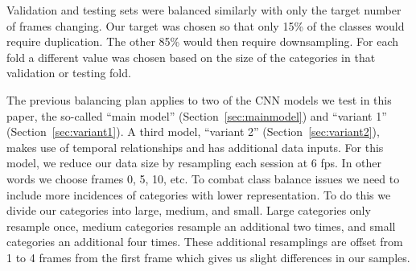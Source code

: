 \documentclass[letterpaper, 10 pt, conference]{ieeeconf}  %
\begin{document}
Validation and testing sets were balanced similarly with only the target number of frames changing. Our target was chosen so that only 15\% of the classes would require duplication. The other 85\% would then require downsampling. For each fold a different value was chosen based on the size of the categories in that validation or testing fold.




The previous balancing plan applies to two of the CNN models we test in this paper, the so-called ``main model'' (Section~\ref{sec:mainmodel}) and ``variant 1''  (Section~\ref{sec:variant1}). A third model, ``variant 2'' (Section~\ref{sec:variant2}), makes use of temporal relationships and has additional data inputs. For this model,  we reduce our data size by resampling each session at 6 fps. In other words we choose frames 0, 5, 10, etc. To combat class balance issues we need to include more incidences of categories with lower representation. To do this we divide our categories into large, medium, and small. Large categories only resample once, medium categories resample an additional two times, and small categories an additional four times. These additional resamplings are offset from 1 to 4 frames from the first frame which gives us slight differences in our samples.
\end{document}
